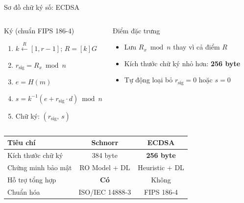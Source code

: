 \begin{frame}{Sơ đồ chữ ký số: ECDSA}
  \begin{columns}[t]
      \begin{block}{Ký (chuẩn FIPS 186-4)}
        \begin{enumerate}
          \item $k \xleftarrow{R} [1, r{-}1]$;\; $R = [k]G$
          \item $r_{\text{sig}} = R_x \bmod n$
          \item $e = H(m)$
          \item $s = k^{-1}(e + r_{\text{sig}} \cdot d) \bmod n$
          \item Chữ ký: $(r_{\text{sig}},\, s)$
        \end{enumerate}
      \end{block}
      \begin{block}{Điểm đặc trưng}
        \begin{itemize}
          \item Lưu $R_x \bmod n$ thay vì cả điểm $R$
          \item Kích thước chữ ký nhỏ hơn: \textbf{256 byte}
          \item Tự động loại bỏ $r_{\text{sig}}=0$ hoặc $s=0$
        \end{itemize}
      \end{block}
  \end{columns}
  \vspace{0.3em}
  \begin{table}
    \small
    \begin{tabular}{lcc}
      \toprule
      Tiêu chí & Schnorr & ECDSA \\
      \midrule
      Kích thước chữ ký & 384 byte & \textbf{256 byte} \\
      Chứng minh bảo mật & RO Model + DL & Heuristic + DL \\
      Hỗ trợ tổng hợp & \textbf{Có} & Không \\
      Chuẩn hóa & ISO/IEC 14888-3 & FIPS 186-4 \\
      \bottomrule
    \end{tabular}
  \end{table}
\end{frame}
